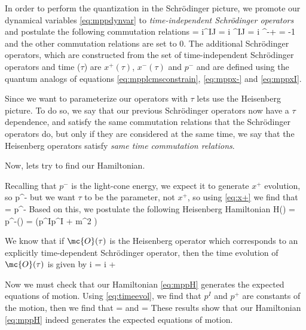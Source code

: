 \documentclass[oneside, 12pt]{book}
\begin{document}
In order to perform the quantization in the Schrödinger picture, we promote our dynamical variables \eqref{eq:mppdynvar} to \textit{time-independent Schrödinger operators} and postulate the following commutation relations
\beq[]  = i\eta^{IJ} = i \delta^{IJ}\qc {} = i \eta^{-+} = -1 \eeq
and the other commutation relations are set to \(0\). The additional Schrödinger operators, which are constructed from the set of time-independent Schrödinger operators and time (\(\tau\)) are \(x^{+}(\tau)\), \(x^{-}(\tau)\) and \(p^{-}\) and are defined using the quantum analogs of equations \eqref{eq:mpplcmsconstrain}, \eqref{eq:mppx-} and \eqref{eq:mppxI}.\par

Since we want to parameterize our operators with \(\tau\) lets use the Heisenberg picture. To do so, we say that our previous Schrödinger operators now have a \(\tau\) dependence, and satisfy the same commutation relations that the Schrödinger operators do, but only if they are considered at the same time, we say that the Heisenberg operators satisfy \textit{same time commutation relations}.\par

Now, lets try to find our Hamiltonian.\par

Recalling that \(p^{-}\) is the light-cone energy, we expect it to generate \(x^{+}\) evolution, so
\beq[]  	\leftrightarrow p^{-}  \eeq
but we want \(\tau\) to be the parameter, not \(x^{+}\), so using \eqref{eq:x+} we find that
\beq[] \pdv{\tau} =  \leftrightarrow {}p^{-} \eeq
Based on this, we postulate the following Heisenberg Hamiltonian
\beq[eq:mppH] H(\tau) = p^{-}(\tau) = \left(p^Ip^I + m^2 \right) \eeq\par

We know that if \(\mc{O}(\tau)\) is the Heisenberg operator which corresponds to an explicitly time-dependent Schrödinger operator, then the time evolution of \(\mc{O}(\tau)\) is given by
\beq[eq:timeevol] i  = i  +  \eeq\par

Now we must check that our Hamiltonian \eqref{eq:mppH} generates the expected equations of motion. Using \eqref{eq:timeevol}, we find that \(p^I\) and \(p^{+}\) are constants of the motion, then we find that
\beq[]  =  \eeq
and
\beq[]  =  \eeq
These results show that our Hamiltonian \eqref{eq:mppH} indeed generates the expected equations of motion.\par
\end{document}
